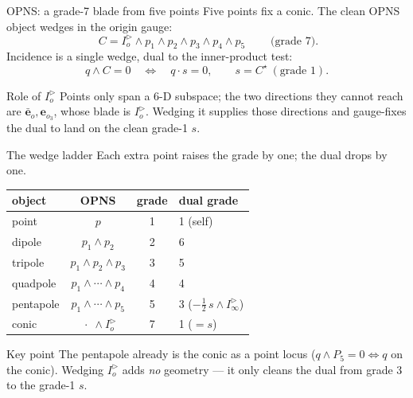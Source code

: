 \documentclass[aspectratio=169, 10pt]{beamer}
\newcommand{\eob}{\bar{\mathbf{e}}_o}
\newcommand{\eoi}[1]{\mathbf{e}_{o_{#1}}}
\newcommand{\Iod}{I_o^{\triangleright}}
\newcommand{\Iinfd}{I_\infty^{\triangleright}}
\newcommand{\wed}{\wedge}
\newcommand{\dotp}{\cdot}
\begin{document}
\begin{frame}[t]{OPNS: a grade-7 blade from five points}
  Five points fix a conic. The clean OPNS object wedges in the \alert{origin gauge}:
  \[
    \boxed{\;C = \Iod \wed p_1 \wed p_2 \wed p_3 \wed p_4 \wed p_5\;}
    \qquad\text{(grade 7)} .
  \]
  \vspace{0.2cm}
  Incidence is a single wedge, dual to the inner-product test:
  \[
    q\wed C = 0 \quad\Longleftrightarrow\quad q\dotp s = 0,
    \qquad s = C^\star \ (\text{grade }1) .
  \]
  \vspace{0.2cm}
  \begin{exampleblock}{Role of $\Iod$}
    Points only span a $6$-D subspace; the two directions they cannot reach are
    $\eob,\eoi3$, whose blade is $\Iod$. Wedging it supplies those directions and
    \alert{gauge-fixes the dual} to land on the clean grade-1 $s$.
  \end{exampleblock}
\end{frame}

\begin{frame}[t]{The wedge ladder}
  Each extra point raises the grade by one; the dual drops by one.
  \vspace{0.3cm}
  \begin{center}
  \renewcommand{\arraystretch}{1.25}
  \begin{tabular}{l c c l}
    object & OPNS & grade & dual grade\\
    \hline
    point      & $p$                                  & 1 & 1 (self)\\
    dipole     & $p_1\wed p_2$                        & 2 & 6\\
    tripole    & $p_1\wed p_2\wed p_3$                & 3 & 5\\
    quadpole   & $p_1\wed\cdots\wed p_4$              & 4 & 4\\
    \alert{pentapole} & $p_1\wed\cdots\wed p_5$       & 5 & 3 \;($-\tfrac12\,s\wed\Iinfd$)\\
    \alert{conic} & $\;\cdot\;\wed\Iod$               & 7 & 1 \;($=s$)\\
  \end{tabular}
  \end{center}
  \vspace{0.3cm}
  \begin{alertblock}{Key point}
    The \alert{pentapole already is} the conic as a point locus
    ($q\wed P_5=0\Leftrightarrow q$ on the conic). Wedging $\Iod$ adds \emph{no}
    geometry --- it only \alert{cleans the dual} from grade 3 to the grade-1 $s$.
  \end{alertblock}
\end{frame}
\end{document}
